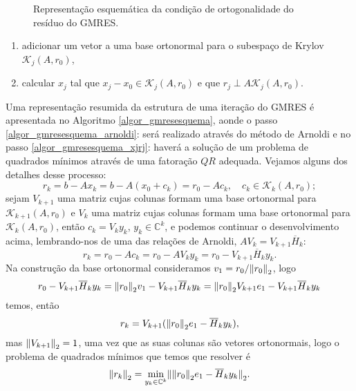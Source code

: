 \begin{figure}[htb]
  \caption{Representação esquemática da condição de ortogonalidade do  resíduo do GMRES.}\label{fig_kryakrybgmres}
\end{figure}


     \begin{algor}[htb]
\caption{GMRES $(A,\;x_0)$ - resumo de uma iteração}\label{algor_gmresesquema}
{%
\begin{enumerate}
\renewcommand{\labelenumi}{\theenumi:}
\setlength{\itemsep}{.01cm}
\item\label{algor_gmresesquema_arnoldi} adicionar um vetor a uma base ortonormal para o subespaço de Krylov $\mathcal{K}_j(A,r_0)$,
\item\label{algor_gmresesquema_xjrj} calcular $x_j$ tal que $x_j-x_0\in \mathcal{K}_j(A,r_0)$ e que $r_j\perp A\mathcal{K}_j(A,r_0)$.
\renewcommand{\labelenumi}{\theenumi.}
\end{enumerate}
}
\end{algor}

Uma representação resumida da estrutura de uma  iteração do GMRES é apresentada no Algoritmo \ref{algor_gmresesquema}, aonde o passo \ref{algor_gmresesquema_arnoldi}: será realizado através do método de Arnoldi e no passo \ref{algor_gmresesquema_xjrj}: haverá a solução de um problema de quadrados mínimos através de uma fatoração $QR$ adequada.
Vejamos alguns dos detalhes desse processo:
\[
r_k=b-Ax_k=b-A(x_0+c_k)=r_0-Ac_k, \quad c_k\in\mathcal{K}_k(A,r_0);
\]
sejam $V_{k+1}$ uma matriz cujas colunas formam uma base ortonormal  para $\mathcal{K}_{k+1}(A,r_0)$ e $V_k$ uma matriz cujas colunas formam uma base ortonormal  para $\mathcal{K}_k(A,r_0)$, então $c_k=V_k y_k$, $y_k\in\mathbb{C}^k$, e podemos continuar o desenvolvimento acima,  lembrando-nos de uma das relações de Arnoldi, $AV_k=V_{k+1}\overline{H}_k$:
\[
r_k=r_0-Ac_k=r_0-AV_ky_k=r_0-V_{k+1}\overline{H}_ky_k.
\]
Na construção da base ortonormal consideramos $v_1=r_0/{\Vert r_0\Vert}_2$, logo
\[
r_0-V_{k+1}\overline{H}_ky_k={\Vert r_0\Vert}_2v_1-V_{k+1}\overline{H}_ky_k={\Vert r_0\Vert}_2V_{k+1}e_1-V_{k+1}\overline{H}_ky_k
\]
temos, então
\[
r_k=V_{k+1}({\Vert r_0\Vert}_2e_1-\overline{H}_ky_k),
\]
 mas ${\Vert V_{k+1}\Vert}_2=1$, uma vez que as suas colunas são  vetores ortonormais, logo o problema de quadrados mínimos que temos que resolver é
\begin{equation}\label{eq_gmresquadmin}
{\Vert r_k\Vert}_2=\underset{y_k\in \mathbb{C}^k}{\min}{\Vert {\Vert r_0\Vert}_2e_1-\overline{H}_ky_k\Vert}_2.
\end{equation}


